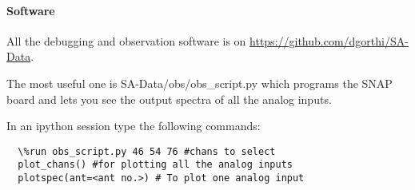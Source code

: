 \documentclass[12pt,usletter,english]{article}
\begin{document}
\paragraph {Software}
All the debugging and observation software is on
\url{https://github.com/dgorthi/SA-Data}.

The most useful one is SA-Data/obs/obs\_script.py which programs the
SNAP board and lets you see the output spectra of all the analog
inputs.

In an ipython session type the following commands:
\begin{lstlisting}
  \%run obs_script.py 46 54 76 #chans to select
  plot_chans() #for plotting all the analog inputs
  plotspec(ant=<ant no.>) # To plot one analog input
\end{lstlisting}
\end{document}
